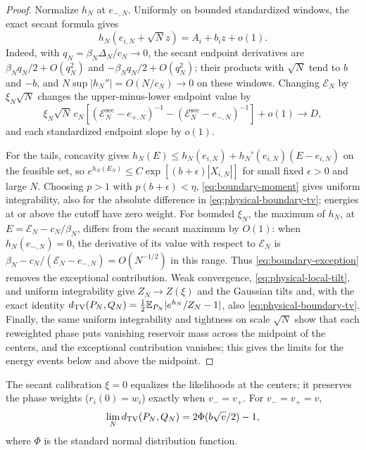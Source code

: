 \begin{proof}
Normalize $h_N$ at $e_{-,N}$. Uniformly on bounded standardized
windows, the exact secant formula gives
\begin{equation}
 h_N(e_{i,N}+\sqrt Nz)=A_i+b_i z+o(1).
 \label{eq:physical-local-tilt}
\end{equation}
Indeed, with $q_N=\beta_N\Delta_N/c_N\to0$, the secant endpoint
derivatives are $\beta_Nq_N/2+O(q_N^2)$ and
$-\beta_Nq_N/2+O(q_N^2)$; their products with $\sqrt N$ tend to
$b$ and $-b$, and $N\sup|h_N''|=O(N/c_N)\to0$ on these windows.
Changing $\mathcal E_N$ by $\xi_N\sqrt N$ changes the upper-minus-lower
endpoint value by
\[
 \xi_N\sqrt N\,c_N
 \left[(\mathcal E_N^{\mathrm{sec}}-e_{+,N})^{-1}
 -(\mathcal E_N^{\mathrm{sec}}-e_{-,N})^{-1}\right]+o(1)
 \longrightarrow D,
\]
and each standardized endpoint slope by $o(1)$.

For the tails, concavity gives
$h_N(E)\le h_N(e_{i,N})+h_N'(e_{i,N})(E-e_{i,N})$
on the feasible set, so
$e^{h_N(E_N)}\le C\exp[(b+\epsilon)|X_{i,N}|]$ for small fixed
$\epsilon>0$ and large $N$. Choosing $p>1$ with $p(b+\epsilon)<\eta$,
\eqref{eq:boundary-moment} gives uniform integrability, also for the
absolute difference in \eqref{eq:physical-boundary-tv}; energies at or
above the cutoff have zero weight.
For bounded $\xi_N$, the maximum of $h_N$, at
$E=\mathcal E_N-c_N/\beta_N$, differs from the secant maximum by
$O(1)$: when $h_N(e_{-,N})=0$, the derivative of its value with
respect to $\mathcal E_N$ is
$\beta_N-c_N/(\mathcal E_N-e_{-,N})=O(N^{-1/2})$ in this range.
Thus \eqref{eq:boundary-exception} removes the exceptional
contribution. Weak convergence, \eqref{eq:physical-local-tilt}, and
uniform integrability give $Z_N\to Z(\xi)$ and the Gaussian tilts and,
with the exact identity $d_{\mathrm{TV}}(P_N,Q_N)=\frac12\mathbb E_{P_N}|e^{h_N}/Z_N-1|$,
also \eqref{eq:physical-boundary-tv}. Finally, the same uniform
integrability and tightness on scale $\sqrt N$ show that each
reweighted phase puts vanishing reservoir mass across the midpoint of
the centers, and the exceptional contribution vanishes; this gives the
limits for the energy events below and above the midpoint.
\end{proof}

The secant calibration $\xi=0$ equalizes the likelihoods at the centers;
it preserves the phase weights ($r_i(0)=w_i$) exactly when
$v_-=v_+$. For $v_-=v_+=v$,
\begin{equation}
 \lim_Nd_{\mathrm{TV}}(P_N,Q_N)=2\Phi(b\sqrt v/2)-1,
 \label{eq:physical-balanced-boundary}
\end{equation}
where $\Phi$ is the standard normal distribution function.

